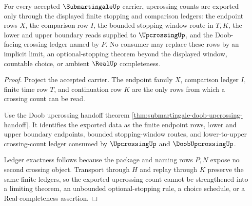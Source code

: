 \begin{theorem}
\label{thm:submartingale-upcrossing-ledger-exactness}
For every accepted $\SubmartingaleUp$ carrier, upcrossing counts are exported only through the displayed finite stopping and comparison ledgers: the endpoint rows $X$, the comparison row $I$, the bounded stopping-window route in $T,K$, the lower and upper boundary reads supplied to $\UpcrossingUp$, and the Doob-facing crossing ledger named by $P$. No consumer may replace these rows by an implicit limit, an optional-stopping theorem beyond the displayed window, countable choice, or ambient $\RealUp$ completeness.
\end{theorem}
\begin{proof}
Project the accepted carrier. The endpoint family $X$, comparison ledger $I$, finite time row $T$, and continuation row $K$ are the only rows from which a crossing count can be read.

Use the Doob upcrossing handoff theorem \autoref{thm:submartingale-doob-upcrossing-handoff}. It identifies the exported data as the finite endpoint rows, lower and upper boundary endpoints, bounded stopping-window routes, and lower-to-upper crossing-count ledger consumed by $\UpcrossingUp$ and $\DoobUpcrossingUp$.

Ledger exactness follows because the package and naming rows $P,N$ expose no second crossing object. Transport through $H$ and replay through $K$ preserve the same finite ledgers, so the exported upcrossing count cannot be strengthened into a limiting theorem, an unbounded optional-stopping rule, a choice schedule, or a Real-completeness assertion.
\end{proof}



